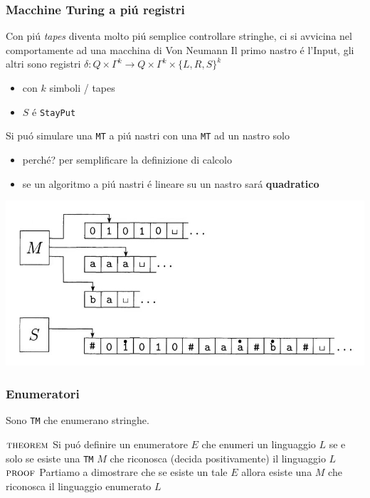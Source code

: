 \documentclass[
                        12pt, %
                        a4paper, %
                        oneside, %
                        headinclude,footinclude, %
                        BCOR5mm, %
                  ]{scrartcl}
\begin{document}
\subsubsection{Macchine Turing a piú registri}
\label{sec:org5316a7a}
Con piú \emph{tapes} diventa molto piú semplice controllare stringhe, ci si avvicina nel comportamente ad una macchina di Von Neumann
Il primo nastro é l'Input, gli altri sono registri
\(\delta: Q \times \Gamma^{k} \longrightarrow Q \times \Gamma^{k} \times \{L,R,S\}^{k}\)
\begin{itemize}
\item con \(k\) simboli / tapes
\item \(S\) é \texttt{StayPut}
\end{itemize}

Si puó simulare una \texttt{MT} a piú nastri con una \texttt{MT} ad un nastro solo
\begin{itemize}
\item perché? per semplificare la definizione di calcolo
\item se un algoritmo a piú nastri é lineare su un nastro sará \textbf{quadratico}
\end{itemize}
\begin{center}
\includegraphics[width=.9\linewidth]{../media/img/3tapes1tape.jpg}
\end{center}
\subsubsection{Enumeratori}
\label{sec:org5591b4c}
Sono \texttt{TM} che enumerano stringhe.

\(\textsc{theorem}\)     Si puó definire un enumeratore \(E\) che enumeri un linguaggio \(L\) se e solo se esiste una \texttt{TM} \(M\) che riconosca (decida positivamente) il linguaggio \(L\)
\(\textsc{proof}\)      Partiamo a dimostrare che se esiste un tale \(E\) allora esiste una \(M\) che riconosca il linguaggio enumerato \(L\)
\end{document}
